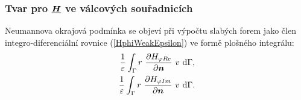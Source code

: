 \documentclass[12pt,a4paper,oneside]{article}
\numberwithin{equation}{section} %
\numberwithin{figure}{section} %
\numberwithin{table}{section} %
\renewcommand{\vec}[1]{\mbox{\boldmath$#1$}} %
\newcommand{\faz}[1]{{\underline{#1}}} %
\begin{document}
\subsubsection*{Tvar pro $\faz{\vec{H}}$ ve válcových souřadnicích}
\label{NeumannHC}
Neumannova okrajová podmínka se objeví při výpočtu slabých forem jako člen integro-diferenciální rovnice (\ref{HphiWeakEpsilon}) ve formě plošného integrálu:
\begin{subequations}
\label{HCweakneumann}
\begin{align}
\frac{1}{\varepsilon} \int _{\Gamma} r ~ \frac{\partial H _{\varphi Re}}{\partial \vec{n}} ~ v ~ \ud \Gamma ,
\\ 
\frac{1}{\varepsilon} \int _{\Gamma} r ~ \frac{\partial H _{\varphi Im}}{\partial \vec{n}} ~ v ~ \ud \Gamma .
\end{align}
\end{subequations}
\end{document}
